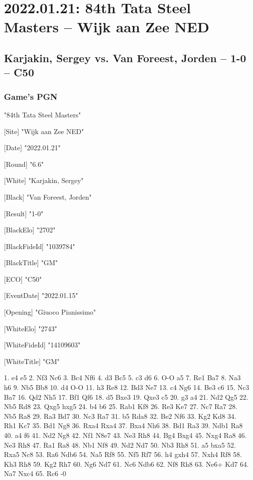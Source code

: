 \documentclass[9pt]{extarticle}
\begin{document}
\section*{2022.01.21: 84th Tata Steel Masters -- Wijk aan Zee NED}

\subsection*{Karjakin, Sergey vs. Van Foreest, Jorden -- 1-0 -- C50}
\subsubsection*{Game's PGN}
\begin{flushleft}
[Event] "84th Tata Steel Masters"

[Site] "Wijk aan Zee NED"

[Date] "2022.01.21"

[Round] "6.6"

[White] "Karjakin, Sergey"

[Black] "Van Foreest, Jorden"

[Result] "1-0"

[BlackElo] "2702"

[BlackFideId] "1039784"

[BlackTitle] "GM"

[ECO] "C50"

[EventDate] "2022.01.15"

[Opening] "Giuoco Pianissimo"

[WhiteElo] "2743"

[WhiteFideId] "14109603"

[WhiteTitle] "GM"

\end{flushleft}
\begin{flushleft}
1. e4 e5 2. Nf3 Nc6 3. Bc4 Nf6 4. d3 Bc5 5. c3 d6 6. O-O a5 7. Re1 Ba7 8. Na3 h6 9. Nb5 Bb8 10. d4 O-O 11. h3 Re8 12. Bd3 Ne7 13. c4 Ng6 14. Be3 c6 15. Nc3 Ba7 16. Qd2 Nh5 17. Bf1 Qf6 18. d5 Bxe3 19. Qxe3 c5 20. g3 a4 21. Nd2 Qg5 22. Nb5 Rd8 23. Qxg5 hxg5 24. b4 b6 25. Rab1 Kf8 26. Re3 Ke7 27. Nc7 Ra7 28. Nb5 Ra8 29. Ra3 Bd7 30. Nc3 Ra7 31. b5 Rda8 32. Be2 Nf6 33. Kg2 Kd8 34. Rh1 Kc7 35. Bd1 Ng8 36. Rxa4 Rxa4 37. Bxa4 Nh6 38. Bd1 Ra3 39. Ndb1 Ra8 40. a4 f6 41. Nd2 Ng8 42. Nf1 N8e7 43. Ne3 Rh8 44. Bg4 Bxg4 45. Nxg4 Ra8 46. Ne3 Rh8 47. Ra1 Ra8 48. Nb1 Nf8 49. Nd2 Nd7 50. Nb3 Rh8 51. a5 bxa5 52. Rxa5 Nc8 53. Ra6 Ndb6 54. Na5 Rf8 55. Nf5 Rf7 56. h4 gxh4 57. Nxh4 Rf8 58. Kh3 Rh8 59. Kg2 Rh7 60. Ng6 Nd7 61. Nc6 Ndb6 62. Nf8 Rh8 63. Ne6+ Kd7 64. Na7 Nxc4 65. Rc6 \quad  {}-0
\end{flushleft}
\end{document}
